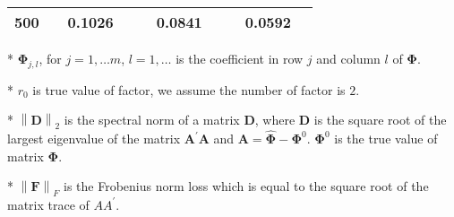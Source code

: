 \documentclass[12pt,a4paper,hyperref]{article}
\begin{document}
\begin{table}[H]
\begin{threeparttable}
\begin{tabular} {*{10}{c}}
500& & 0.1026& &  &0.0841& & &0.0592 & \\
\bottomrule
\end{tabular}
\begin{tablenotes}
\footnotesize
  \item[*] $\boldsymbol{\Phi}_{j,l}$, for $j=1,\ldots m$, $l=1,\ldots$ is the coefficient in row $j$ and column $l$ of $\boldsymbol{\Phi}$.
\item[*] $r_{0}$ is true value of factor, we assume the number of factor is $2$.
 \item[*] $\left\| \boldsymbol{D} \right\|_{2}$ is the spectral norm of a matrix $\boldsymbol{D}$, where $\boldsymbol{D}$ is the square root of the largest eigenvalue of the matrix $\boldsymbol{A}^{'}\boldsymbol{A}$ and $\boldsymbol{A}=\hat{\boldsymbol{\Phi}}- \boldsymbol{\Phi}^{0}$. $\boldsymbol{\Phi}^{0}$ is the true value of matrix $\boldsymbol{\Phi}$.
 \item[*] $\left\| \boldsymbol{F} \right\|_{F} $ is the Frobenius norm loss which is equal to the square root of the matrix trace of $AA^{'}$.
    \end{tablenotes}
\end{threeparttable}
\end{table}
\end{document}
